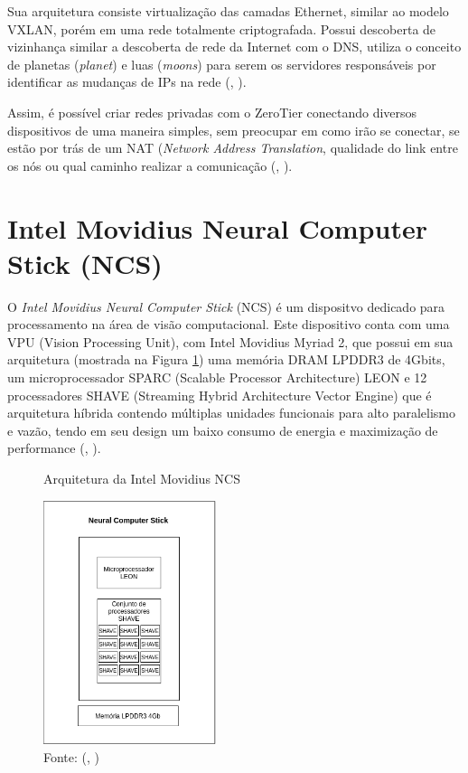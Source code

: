 \documentclass[]{politex}
\begin{document}
Sua arquitetura consiste virtualização das camadas Ethernet, similar ao modelo VXLAN, porém em uma rede totalmente criptografada. Possui descoberta de vizinhança similar a descoberta de rede da Internet com o DNS, utiliza o conceito de planetas (\textit{planet}) e luas (\textit{moons}) para serem os servidores responsáveis por identificar as mudanças de IPs na rede (, \citeyear{zerotier}).

Assim, é possível criar redes privadas com o ZeroTier conectando diversos dispositivos de uma maneira simples, sem preocupar em como irão se conectar, se estão por trás de um NAT (\textit{Network Address Translation}, qualidade do link entre os nós ou qual caminho realizar a comunicação (, \citeyear{zerotier}).

\section{Intel Movidius Neural Computer Stick (NCS)}
O \textit{Intel Movidius Neural Computer Stick} (NCS) é um dispositvo dedicado para processamento na área de visão computacional. Este dispositivo conta com uma VPU (Vision Processing Unit), com Intel Movidius Myriad 2, que possui em sua arquitetura (mostrada na Figura \ref{fig:intel_movidius}) uma memória DRAM LPDDR3 de 4Gbits, um microprocessador SPARC (Scalable Processor Architecture) LEON e 12 processadores SHAVE (Streaming Hybrid Architecture Vector Engine) que é arquitetura híbrida contendo múltiplas unidades funcionais para alto paralelismo e vazão, tendo em seu design um baixo consumo de energia e maximização de performance (, \citeyear{intel_movidius}).

\begin{figure}[H]
    \centering
    \caption{Arquitetura da Intel Movidius NCS}
    \includegraphics[width=0.45\textwidth]{arquitetura_ncs}
    \caption*{Fonte: (, \citeyear{intel_movidius})}
    \label{fig:intel_movidius}
\end{figure}
\end{document}

